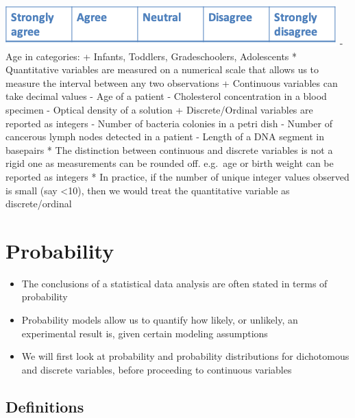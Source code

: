 \documentclass[
]{book}
\providecommand{\tightlist}{%
  \setlength{\itemsep}{0pt}\setlength{\parskip}{0pt}}
\begin{document}
\includegraphics[width=0.5\linewidth]{./2_6}
- Age in categories:
+ Infants, Toddlers, Gradeschoolers, Adolescents
* Quantitative variables are measured on a numerical scale that allows us to measure the interval between any two observations
+ Continuous variables can take decimal values
- Age of a patient
- Cholesterol concentration in a blood specimen
- Optical density of a solution
+ Discrete/Ordinal variables are reported as integers
- Number of bacteria colonies in a petri dish
- Number of cancerous lymph nodes detected in a patient
- Length of a DNA segment in basepairs
* The distinction between continuous and discrete variables is not a rigid one as measurements can be rounded off.
e.g.~age or birth weight can be reported as integers
* In practice, if the number of unique integer values observed is small (say \textless10), then we would treat the quantitative variable as discrete/ordinal

\hypertarget{probability}{%
\section{Probability}\label{probability}}

\begin{itemize}
\tightlist
\item
  The conclusions of a statistical data analysis are often stated in terms of probability
\item
  Probability models allow us to quantify how likely, or unlikely, an experimental result is, given certain modeling assumptions
\item
  We will first look at probability and probability distributions for dichotomous and discrete variables, before proceeding to continuous variables
\end{itemize}

\hypertarget{definitions}{%
\subsection{Definitions}\label{definitions}}
\end{document}

